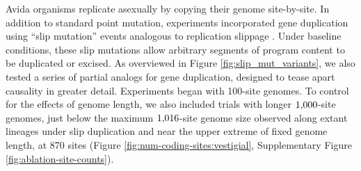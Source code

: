 Avida organisms replicate asexually by copying their genome site-by-site.
In addition to standard point mutation, experiments
incorporated gene duplication using ``slip mutation'' events analogous to replication slippage \citep{bzymek_instability_2001}.
Under baseline conditions, these slip mutations allow arbitrary segments of program content to be duplicated or excised.
As overviewed in Figure \ref{fig:slip_mut_variants}, we also tested a series of partial analogs for gene duplication, designed to tease apart causality in greater detail.
Experiments began with 100-site genomes.
To control for the effects of genome length, we also included trials with longer $1{\small,}000$-site genomes, just below the maximum $1{\small,}016$-site genome size observed along extant lineages under slip duplication and near the upper extreme of fixed genome length, at 870 sites (Figure \ref{fig:num-coding-sites:vestigial}, Supplementary Figure \ref{fig:ablation-site-counts}).



